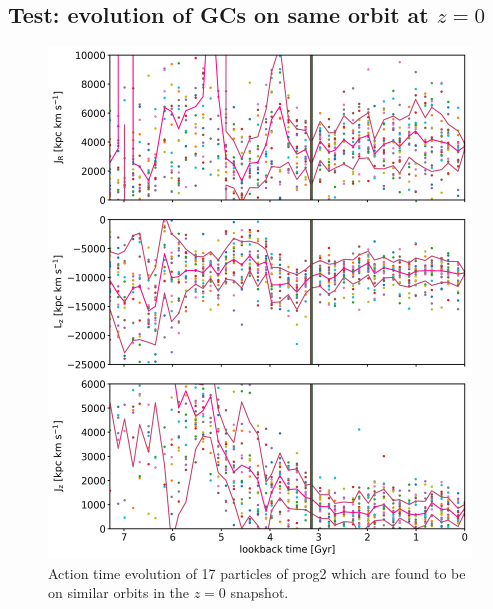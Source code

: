 \subsection{Test: evolution of \acp{GC} on same orbit at $z=0$}\label{subsec:box_GCs}
\begin{figure}[htbp]
\captionsetup{format=plain}
    \centering
	\includegraphics[width=\textwidth]{plots/Dynamics/prog2/action_time_evolution_box_hist_mean_prog2.png}

	\caption{Action time evolution of 17 particles of prog2 which are found to be on similar orbits in the $z=0$ snapshot. }\label{fig:actions_box_time_evolution_prog2}
\end{figure}

